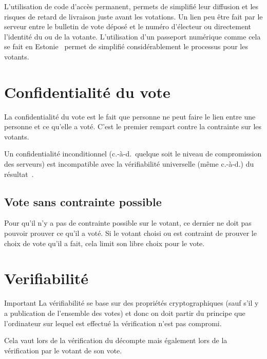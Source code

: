 \documentclass[../report]{subfiles}
\begin{document}
L'utilisation de code d'accès permanent, permets de simplifié leur diffusion et les risques de retard de livraison juste avant les votations.
Un lien peu être fait par le serveur entre le bulletin de vote déposé et le numéro d'électeur ou directement l'identité du ou de la votante.
L'utilisation d'un passeport numérique comme cela se fait en Estonie~\cite{vassil_diffusion_2016} permet de simplifié considérablement le processus
pour les votants.

\todo{}
\section{Confidentialité du vote}
La confidentialité du vote est le fait que personne ne peut faire le lien entre une personne
et ce qu'elle a voté.
C'est le premier rempart contre la contrainte sur les votants.

Un confidentialité inconditionnel (c.-à-d.\ quelque soit le niveau de compromission des serveurs)
est incompatible avec la vérifiabilité universelle (même c.-à-d.) du 
résultat~\cite{chevallier-mames_incompatible_2010,gharadaghy_verifiability_2010}.
\todo{}

\subsection{Vote sans contrainte possible}

Pour qu'il n'y a pas de contrainte possible sur le votant, ce dernier ne doit pas pouvoir prouver
ce qu'il a voté. 
Si le votant choisi ou est contraint de prouver le choix de vote qu'il a fait, cela limit
son libre choix pour le vote.
\todo{}

\section{Verifiabilité}

\begin{important}{Important}
  La vérifiabilité se base sur des propriétés cryptographiques (sauf s'il y a publication 
  de l'ensemble des votes) et donc on doit partir du principe que l'ordinateur sur lequel 
  est effectué la vérification n'est pas compromi.

  Cela vaut lors de la vérification du décompte mais également 
  lors de la vérification par le votant de son vote.
\end{important}
\todo{}
\end{document}
